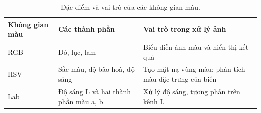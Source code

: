 \begin{table}[H]
\centering
\caption{Đặc điểm và vai trò của các không gian màu.}
\label{tab:khonggianmau}
\small
\begin{tabularx}{\textwidth}{|p{2.2cm}|p{3cm}|X|}
\toprule
\textbf{Không gian màu} & \textbf{Các thành phần} & \textbf{Vai trò trong xử lý ảnh} \\
\midrule
RGB & Đỏ, lục, lam & Biểu diễn ảnh màu và hiển thị kết quả \\ \hline
HSV & Sắc màu, độ bão hoà, độ sáng & Tạo mặt nạ vùng màu; phân tích màu đặc trưng của biển \\ \hline
Lab & Độ sáng L và hai thành phần màu a, b & Xử lý độ sáng, tương phản trên kênh L \\
\bottomrule
\end{tabularx}
\end{table}
